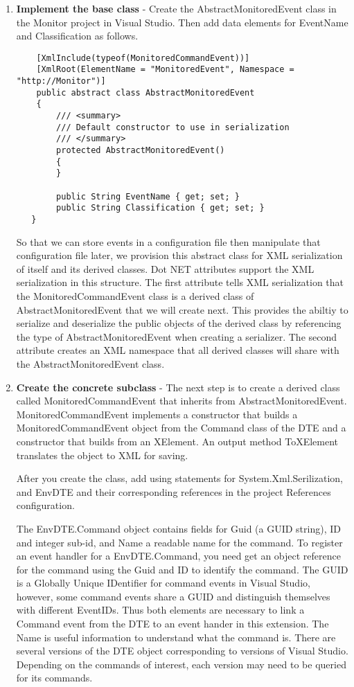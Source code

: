 \begin{enumerate}
\item {\bf Implement the base class} - 
Create the AbstractMonitoredEvent class in the Monitor project in Visual Studio.  Then add data elements for EventName and Classification as follows.

\begin{lstlisting}
    [XmlInclude(typeof(MonitoredCommandEvent))]
    [XmlRoot(ElementName = "MonitoredEvent", Namespace = "http://Monitor")]
    public abstract class AbstractMonitoredEvent
    {
        /// <summary>
        /// Default constructor to use in serialization
        /// </summary>
        protected AbstractMonitoredEvent()
        {
        }

        public String EventName { get; set; }
        public String Classification { get; set; }
   }
\end{lstlisting}

So that we can store events in a configuration file then manipulate that configuration file later, we provision this abstract class for XML serialization of itself and its derived classes.  Dot NET attributes support the XML serialization in this structure.  The first attribute tells XML serialization that the MonitoredCommandEvent class is a derived class of AbstractMonitoredEvent that we will create next.  This provides the abiltiy to serialize and deserialize the public objects of the derived class by referencing the type of AbstractMonitoredEvent when creating a serializer.  The second attribute creates an XML namespace that all derived classes will share with the AbstractMonitoredEvent class.

\item {\bf Create the concrete subclass} - 
The next step is to create a derived class called MonitoredCommandEvent that inherits from AbstractMonitoredEvent.  MonitoredCommandEvent implements a constructor that builds a MonitoredCommandEvent object from the Command class of the DTE and a constructor that builds from an XElement.  An output method ToXElement translates the object to XML for saving.

After you create the class, add using statements for System.Xml.Serilization, and EnvDTE and their corresponding references in the project References configuration. 

The EnvDTE.Command object contains fields for Guid (a GUID string), ID and integer sub-id, and Name a readable name for the command.  To register an event handler for a EnvDTE.Command, you need get an object reference for the command using the Guid and ID to identify the command.  The GUID is  a Globally Unique IDentifier for command events in Visual Studio, however, some command events share a GUID and distinguish themselves with different EventIDs. Thus both elements are necessary to link a Command event from the DTE to an event hander in this extension.  The Name is useful information to understand what the command is.    There are several versions of the DTE object corresponding to versions of Visual Studio.  Depending on the commands of interest, each version may need to be queried for its commands.  


\end{enumerate}
